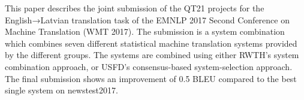 This paper describes the joint submission of the QT21 projects for the English→Latvian translation task of the EMNLP 2017 Second Conference on Machine Translation (WMT 2017). The submission is a system combination which combines seven different statistical machine translation systems provided by the different groups. The systems are combined using either RWTH's system combination approach, or USFD's consensus-based system-selection approach. The final submission shows an improvement of 0.5 BLEU compared to the best single system on newstest2017.
